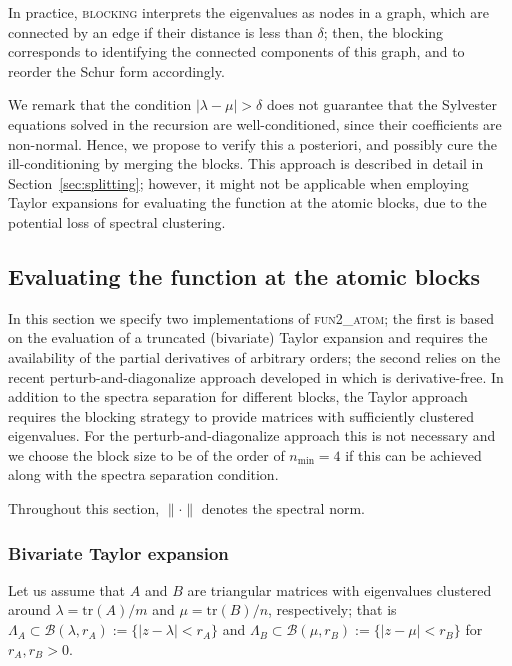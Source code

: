 \documentclass{siamart1116}
\newcommand{\trace}{\mathrm{tr}}
\newcommand{\norm}[1]{\lVert#1\rVert}
\begin{document}
In practice, \textsc{blocking} interprets the eigenvalues as nodes 
in a graph, which are connected by an edge if their distance is less than
$\delta$; then, the blocking corresponds to identifying the connected
components of this graph, and to reorder the Schur form accordingly.

We remark that the condition $|\lambda - \mu| > \delta$ does not 
guarantee that the Sylvester equations solved in the recursion 
are well-conditioned, since their coefficients are non-normal. Hence, 
we propose to verify this a posteriori, and possibly cure the ill-conditioning  by merging 
the blocks. This approach is described in detail in Section~\ref{sec:splitting}; however,
it might not be applicable when employing Taylor expansions for 
evaluating the function at the atomic blocks, due to the potential loss of 
spectral clustering. 

\subsection{Evaluating the function at the atomic blocks}\label{sec:atom}
In this section we specify two implementations of \textsc{fun2\_atom}; the first is based on the evaluation of a truncated (bivariate) Taylor expansion
and requires the availability of the partial derivatives of arbitrary
orders; the second relies on the recent perturb-and-diagonalize approach developed in \cite{higham2020multiprecision} which is
derivative-free. In addition to the spectra separation
for different blocks, the Taylor approach requires the 
blocking strategy to provide matrices with
sufficiently clustered eigenvalues. For the 
perturb-and-diagonalize approach this is not necessary and
we choose  the block size to be of the order of $n_{\min}=4$ 
if this can be achieved along with the spectra separation 
condition. 

Throughout this section, $\norm{\cdot}$ denotes the spectral norm.
\subsubsection{Bivariate Taylor expansion} \label{sec:taylor}
Let us assume that $A$ and $B$ are triangular matrices with eigenvalues clustered around $\lambda = \trace(A) / m$ 
and $\mu = \trace(B)/n$, respectively; that is  $\Lambda_A\subset \mathcal B(\lambda, r_A):=\{|z-\lambda|< r_A\}$ and $\Lambda_B\subset \mathcal B(\mu, r_B):=\{|z-\mu|< r_B\}$ for $r_A,r_B>0$.
\end{document}
